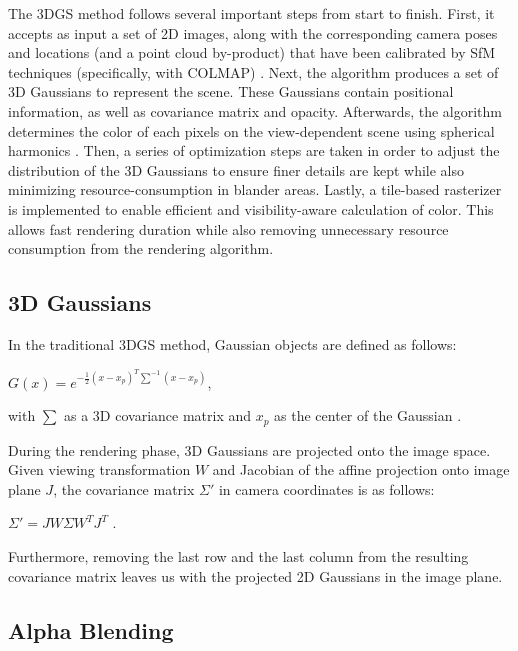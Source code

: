 The 3DGS method follows several important steps from start to finish. First, it accepts as input a set of 2D images, along with the corresponding camera poses and locations (and a point cloud by-product) that have been calibrated by SfM techniques (specifically, with COLMAP) \parencite{colmap1} \parencite{colmap2}. Next, the algorithm produces a set of 3D Gaussians to represent the scene. These Gaussians contain positional information, as well as covariance matrix and opacity. Afterwards, the algorithm determines the color of each pixels on the view-dependent scene using spherical harmonics \parencite{sh-1} \parencite{sh-2}. Then, a series of optimization steps are taken in order to adjust the distribution of the 3D Gaussians to ensure finer details are kept while also minimizing resource-consumption in blander areas. Lastly, a tile-based rasterizer is implemented to enable efficient and visibility-aware calculation of color. This allows fast rendering duration while also removing unnecessary resource consumption from the rendering algorithm.

\subsection{3D Gaussians}

In the traditional 3DGS method, Gaussian objects are defined as follows:

\begin{center}
    \(G(x) = e^{-\frac{1}{2}(x - x_p)^T\sum^{-1}(x - x_p)}\),
\end{center}
with \(\sum\) as a 3D covariance matrix and \(x_p\) as the center of the Gaussian \parencite{gaussian}. 

During the rendering phase, 3D Gaussians are projected onto the image space. Given viewing transformation \(W\) and Jacobian of the affine projection onto image plane \(J\), the covariance matrix \(\Sigma'\) in camera coordinates is as follows:

\begin{center}
    \(\Sigma' = J W \Sigma W^T J^T\) \parencite{gaussian}.
\end{center}
Furthermore, removing the last row and the last column from the resulting covariance matrix leaves us with the projected 2D Gaussians in the image plane.

\subsection{Alpha Blending}

